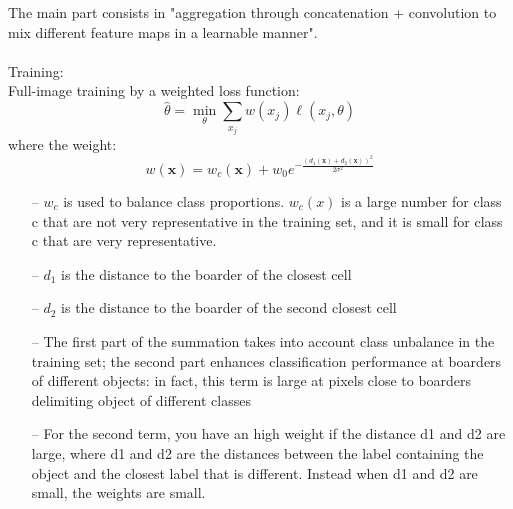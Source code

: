 The main part consists in "aggregation through concatenation + convolution to mix different feature maps in a learnable manner". \\ \\
Training:\\
Full-image training by a weighted loss function:
$$
\hat{\theta}=\min _{\theta} \sum_{x_{j}} w\left(x_{j}\right) \ell\left(x_{j}, \theta\right)
$$
where the weight: 
$$
w(\boldsymbol{x})=w_{c}(\boldsymbol{x})+w_{0} e^{-\frac{\left(d_{1}(\boldsymbol{x})+d_{2}(\boldsymbol{x})\right)^{2}}{2 \sigma^{2}}}
$$
\begin{itemize}
    \item[--] $w_c$ is used to balance class proportions. $w_c(x)$ is a large number for class c that are not very representative in the training set, and it is small for class c that are very representative. 
    \item[--] $d_1$ is the distance to the boarder of the closest cell
    \item[--] $d_2$ is the distance to the boarder of the second closest cell
    \item[--] The first part of the summation takes into account class unbalance in the training set; the second part enhances classification performance at boarders of different objects: in fact, this term is large at pixels close to boarders delimiting object of different classes
    \item[--] For the second term, you have an high weight if the distance  d1 and d2 are large, where d1 and d2 are the distances between the label containing the object and the closest label that is different. Instead when d1 and d2 are small, the weights are small. 
\end{itemize}{}

